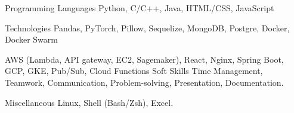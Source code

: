 

\begin{cvskills}

  \cvskill
    {Programming Languages} %
    {Python, C/C++, Java, HTML/CSS, JavaScript} %

  \cvskill
    {Technologies} %
    {Pandas, PyTorch, Pillow, Sequelize, MongoDB, Postgre, Docker, Docker Swarm}

  \cvskill 
  {}
  {AWS (Lambda, API gateway, EC2, Sagemaker), React, Nginx, Spring Boot, GCP, GKE, Pub/Sub, Cloud Functions}
  \cvskill
    {Soft Skills} %
    {Time Management, Teamwork, Communication, Problem-solving, Presentation, Documentation.} %



  \cvskill
    {Miscellaneous} %
    {Linux, Shell (Bash/Zsh),  Excel.} %

\end{cvskills}



